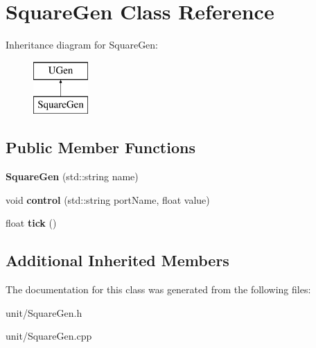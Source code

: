\hypertarget{classSquareGen}{}\section{Square\+Gen Class Reference}
\label{classSquareGen}
Inheritance diagram for Square\+Gen\+:\begin{figure}[H]
\begin{center}
\leavevmode
\includegraphics[height=2.000000cm]{classSquareGen}
\end{center}
\end{figure}
\subsection*{Public Member Functions}
\begin{DoxyCompactItemize}
\item 
{\bfseries Square\+Gen} (std\+::string name)\hypertarget{classSquareGen_a626505e8ade08b9383acda8901aa23b5}{}\label{classSquareGen_a626505e8ade08b9383acda8901aa23b5}

\item 
void {\bfseries control} (std\+::string port\+Name, float value)\hypertarget{classSquareGen_a8a25dc2b8c5d1ec7857e4da7ec96cecc}{}\label{classSquareGen_a8a25dc2b8c5d1ec7857e4da7ec96cecc}

\item 
float {\bfseries tick} ()\hypertarget{classSquareGen_a119ab47582ee5814687b87db6a71644c}{}\label{classSquareGen_a119ab47582ee5814687b87db6a71644c}

\end{DoxyCompactItemize}
\subsection*{Additional Inherited Members}


The documentation for this class was generated from the following files\+:\begin{DoxyCompactItemize}
\item 
unit/Square\+Gen.\+h\item 
unit/Square\+Gen.\+cpp\end{DoxyCompactItemize}
